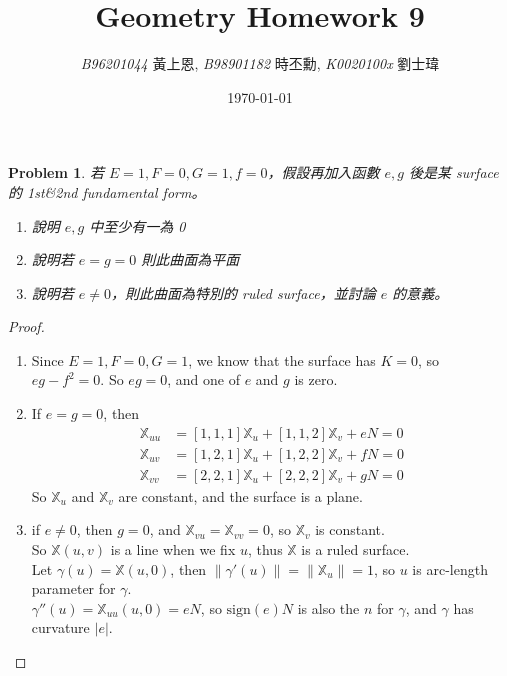 \documentclass[10pt,a4paper]{article}
\newcommand{\LiHei}{\CJKfamily{lh}}
\newcounter{theProblemCounter}
\newtheorem{problem}[theProblemCounter]{Problem}
\begin{document}
\title{{Geometry Homework 9}}
\author{{\it{B96201044}} {\LiHei 黃上恩}, {\it{B98901182}} {\LiHei 時丕勳}, {\it{K0020100x}} {\LiHei 劉士瑋}}
\date{\today}
\maketitle

\newcommand{\bx}{\mathbb{X}}
\newcommand{\bfx}{\mathbf{X}}
\newcommand{\grad}{\textrm{grad }}
\newcommand{\sech}{\mbox{sech}}

\setcounter{theProblemCounter}{1}
\begin{problem} 若 $E=1, F=0, G=1, f=0$，假設再加入函數 $e, g$ 後是某 surface 的 1st\&2nd fundamental form。
\begin{enumerate}
\item[(a)] 說明 $e, g$ 中至少有一為 0
\item[(b)] 說明若 $e=g=0$ 則此曲面為平面
\item[(c)] 說明若 $e\ne 0$，則此曲面為特別的 ruled surface，並討論 $e$ 的意義。
\end{enumerate}
\end{problem}
\begin{proof}
\begin{enumerate}
\item[(a)]
Since $E=1, F=0, G=1$, we know that the surface has $K=0$, so $eg-f^2=0$. So $eg=0$, and one of $e$ and $g$ is zero.
\item[(b)]
If $e=g=0$, then
\begin{align*}
\bx_{uu}&=[1,1,1]\bx_u+[1,1,2]\bx_v+eN=0\\
\bx_{uv}&=[1,2,1]\bx_u+[1,2,2]\bx_v+fN=0\\
\bx_{vv}&=[2,2,1]\bx_u+[2,2,2]\bx_v+gN=0
\end{align*}
So $\bx_u$ and $\bx_v$ are constant, and the surface is a plane.
\item[(c)]
if $e\ne 0$, then $g=0$, and $\bx_{vu}=\bx_{vv}=0$, so $\bx_v$ is constant.\\
So $\bx(u,v)$ is a line when we fix $u$, thus $\bx$ is a ruled surface.\\
Let $\gamma(u)=\bx(u,0)$, then $\|\gamma'(u)\|=\|\bx_u\|=1$, so $u$ is arc-length parameter for $\gamma$.\\
$\gamma''(u)=\bx_{uu}(u,0)=eN$, so $\textrm{sign}(e)N$ is also the $n$ for $\gamma$, and $\gamma$ has curvature $|e|$.
\end{enumerate}
\end{proof}
\end{document}
